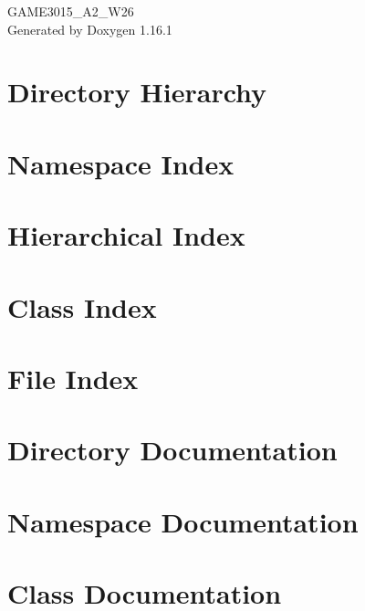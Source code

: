 \documentclass[twoside]{book}
\newcommand{\+}{\discretionary{\mbox{\scriptsize$\hookleftarrow$}}{}{}}
\newcommand{\clearemptydoublepage}{%
    \newpage{\pagestyle{empty}\cleardoublepage}%
  }
\begin{document}
  \raggedbottom
    \hypersetup{pageanchor=false,
                bookmarksnumbered=true,
                pdfencoding=unicode
               }
  \begin{titlepage}
  \vspace*{7cm}
  \begin{center}%
  {\Large GAME3015\+\_\+\+A2\+\_\+\+W26}\\
  \vspace*{1cm}
  {\large Generated by Doxygen 1.16.1}\\
  \end{center}
  \end{titlepage}
  \clearemptydoublepage
  \tableofcontents
  \clearemptydoublepage
  \hypersetup{pageanchor=true}
\chapter{Directory Hierarchy}

\chapter{Namespace Index}

\chapter{Hierarchical Index}

\chapter{Class Index}

\chapter{File Index}

\chapter{Directory Documentation}

\chapter{Namespace Documentation}

\chapter{Class Documentation}
















\end{document}
